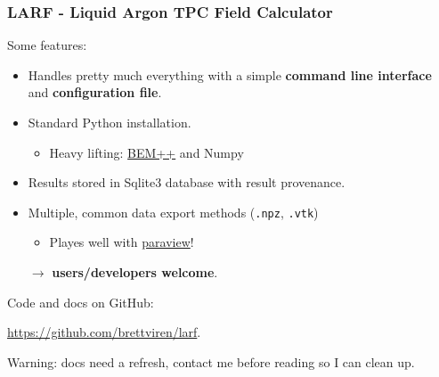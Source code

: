 \documentclass[xcolor=dvipsnames]{beamer}
\begin{document}
\begin{frame}[fragile]
  \frametitle{LARF - \textbf{L}iquid \textbf{Ar}gon TPC \textbf{F}ield Calculator}

  Some features:
  \begin{itemize}
  \item Handles pretty much everything with a simple \textbf{command line interface} and \textbf{configuration file}.
  \item Standard Python installation.
    \begin{itemize}
    \item Heavy lifting: \href{http://www.bempp.org/}{BEM++} and Numpy
    \end{itemize}
  \item Results stored in Sqlite3 database with result provenance.
  \item Multiple, common data export methods (\texttt{.npz}, \texttt{.vtk})
    \begin{itemize}
    \item Playes well with \href{http://www.paraview.org}{paraview}!
    \end{itemize}
  \item[$\rightarrow$] \textbf{users/developers welcome}.
  \end{itemize}

  Code and docs on GitHub:
  \begin{center}
    \url{https://github.com/brettviren/larf}.    
  \end{center}

  \scriptsize Warning: docs need a refresh, contact me before reading so I can clean up.
\end{frame}
\end{document}
